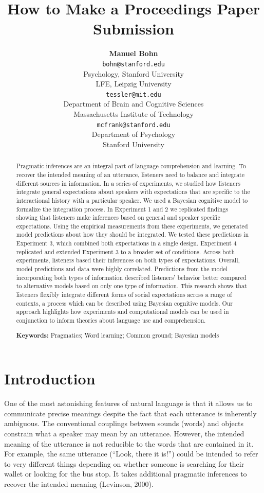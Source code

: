 \documentclass[10pt, letterpaper]{article}
\title{How to Make a Proceedings Paper Submission}
\author{{\large \bf Manuel Bohn} \\ \texttt{bohn@stanford.edu} \\ Psychology, Stanford University \\ LFE, Leipzig University 
 \And {\large \bf Michael Henry Tessler} \\ \texttt{tessler@mit.edu} \\ Department of Brain and Cognitive Sciences \\ Massachusetts Institute of Technology
 \And {\large \bf Michael C. Frank} \\ \texttt{mcfrank@stanford.edu} \\ Department of Psychology \\ Stanford University}
\begin{document}
\maketitle

\begin{abstract}
Pragmatic inferences are an integral part of language comprehension and
learning. To recover the intended meaning of an utterance, listeners
need to balance and integrate different sources in information. In a
series of experiments, we studied how listeners integrate general
expectations about speakers with expectations that are specific to the
interactional history with a particular speaker. We used a Bayesian
cognitive model to formalize the integration process. In Experiment 1
and 2 we replicated findings showing that listeners make inferences
based on general and speaker specific expectations. Using the empirical
measurements from these experiments, we generated model predictions
about how they should be integrated. We tested these predictions in
Experiment 3, which combined both expectations in a single design.
Experiment 4 replicated and extended Experiment 3 to a broader set of
conditions. Across both experiments, listeners based their inferences on
both types of expectations. Overall, model predictions and data were
highly correlated. Predictions from the model incorporating both types
of information described listeners' behavior better compared to
alternative models based on only one type of information. This research
shows that listeners flexibly integrate different forms of social
expectations across a range of contexts, a process which can be
described using Bayesian cognitive models. Our approach highlights how
experiments and computational models can be used in conjunction to
inform theories about language use and comprehension.

\textbf{Keywords:}
Pragmatics; Word learning; Common ground; Bayesian models
\end{abstract}

\section{Introduction}\label{introduction}

One of the most astonishing features of natural language is that it
allows us to communicate precise meanings despite the fact that each
utterance is inherently ambiguous. The conventional couplings between
sounds (words) and objects constrain what a speaker may mean by an
utterance. However, the intended meaning of the utterance is not
reducible to the words that are contained in it. For example, the same
utterance (``Look, there it is!'') could be intended to refer to very
different things depending on whether someone is searching for their
wallet or looking for the bus stop. It takes additional pragmatic
inferences to recover the intended meaning (Levinson, 2000).
\end{document}
